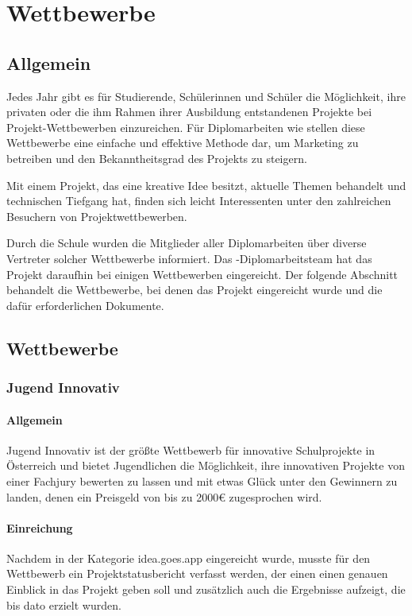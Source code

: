 \chapter{Wettbewerbe}
\renewcommand{\kapitelautor}{Autor: Andreas Novak}

\section{Allgemein}
Jedes Jahr gibt es für Studierende, Schülerinnen und Schüler die Möglichkeit, ihre privaten
oder die ihm Rahmen ihrer Ausbildung entstandenen Projekte bei Projekt-Wettbewerben
einzureichen. Für Diplomarbeiten wie \sblit stellen diese Wettbewerbe eine einfache und effektive
Methode dar, um Marketing zu betreiben und den Bekanntheitsgrad des Projekts zu steigern.

Mit einem Projekt, das eine kreative Idee besitzt, aktuelle Themen behandelt und technischen Tiefgang hat,
finden sich leicht Interessenten unter den zahlreichen Besuchern von Projektwettbewerben.

Durch die Schule wurden die Mitglieder aller Diplomarbeiten über diverse Vertreter
solcher Wettbewerbe informiert. Das \sblit-Diplomarbeitsteam hat das Projekt daraufhin bei einigen
Wettbewerben eingereicht. Der folgende Abschnitt behandelt die Wettbewerbe, bei denen das Projekt
eingereicht wurde und die dafür erforderlichen Dokumente.

\section{Wettbewerbe}
\subsection{Jugend Innovativ}
\subsubsection{Allgemein}
Jugend Innovativ ist der größte Wettbewerb für innovative Schulprojekte in Österreich und
bietet Jugendlichen die Möglichkeit, ihre innovativen Projekte von einer Fachjury bewerten zu lassen
und mit etwas Glück unter den Gewinnern zu landen, denen ein Preisgeld von bis zu 2000€ zugesprochen wird.

\subsubsection{Einreichung}
Nachdem \sblit in der Kategorie idea.goes.app eingereicht wurde, musste für den Wettbewerb ein
Projektstatusbericht verfasst werden, der einen einen genauen Einblick in das Projekt geben soll
und zusätzlich auch die Ergebnisse aufzeigt, die bis dato erzielt wurden.

